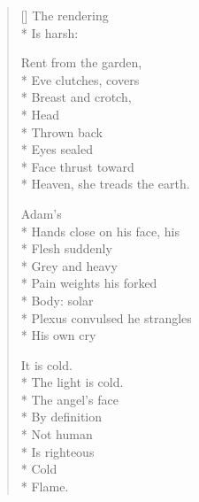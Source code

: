 \label{ch:masaccio}
\settowidth{\versewidth}{Plexus convulsed he strangles}
\begin{verse}[\versewidth]
The rendering\\*
Is harsh:

Rent from the garden,\\*
Eve clutches, covers\\*
Breast and crotch,\\*
Head\\*
Thrown back\\*
Eyes sealed\\*
Face thrust toward\\*
Heaven, she treads the earth.

Adam's \\*
Hands close on his face, his\\*
Flesh suddenly\\*
Grey and heavy\\*
Pain weights his forked \\*
Body: solar\\*
Plexus convulsed he strangles\\*
His own cry

It is cold.\\*
The light is cold.\\*
The angel's face\\*
By definition\\*
Not human\\*
Is righteous\\*
Cold\\*
Flame.
\end{verse}
